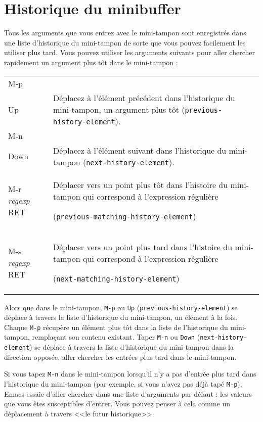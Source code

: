 \section{Historique du minibuffer}

Tous les arguments que vous entrez avec le mini-tampon sont
enregistrés dans une liste d'historique du mini-tampon de sorte que
vous pouvez facilement les utiliser plus tard. Vous pouvez utiliser
les arguments suivants pour aller chercher rapidement un argument plus
tôt dans le mini-tampon :
\begin{center}
  \begin{tabular}[m]{>{\ttfamily}lp{.85\linewidth}}
    M-p & \\
    Up & Déplacez à l'élément précédent dans l'historique du
    mini-tampon, un argument plus tôt
    (\texttt{previous-history-element}). \\
    M-n & \\
    Down & Déplacez à l'élément suivant dans l'historique du
    mini-tampon (\texttt{next-history-element}). \\
    M-r \textit{regexp} RET & Déplacer vers un point plus tôt dans l'histoire
    du mini-tampon qui correspond à l'expression régulière \par
    (\texttt{previous-matching-history-element})\\
    M-s \textit{regexp} RET & Déplacer vers un point plus tard dans l'histoire
    du mini-tampon qui correspond à l'expression régulière \par
    (\texttt{next-matching-history-element})
  \end{tabular}
\end{center}

Alors que dans le mini-tampon, \texttt{M-p} ou \texttt{Up}
(\texttt{previous-history-element}) se déplace à travers la liste
d'historique du mini-tampon, un élément à la fois. Chaque \texttt{M-p}
récupère un élément plus tôt dans la liste de l'historique du
mini-tampon, remplaçant son contenu existant. Taper \texttt{M-n} ou
\texttt{Down} (\texttt{next-history-element}) se déplace à travers la
liste d'historique du mini-tampon dans la direction opposée, aller
chercher les entrées plus tard dans le mini-tampon.

Si vous tapez \texttt{M-n} dans le mini-tampon lorsqu'il n'y a pas
d'entrée plus tard dans l'historique du mini-tampon (par exemple, si
vous n'avez pas déjà tapé \texttt{M-p}), Emacs essaie d'aller chercher
dans une liste d'arguments par défaut : les valeurs que vous êtes
susceptibles d'entrer. Vous pouvez penser à cela comme un déplacement
à travers <<le futur historique>>.

